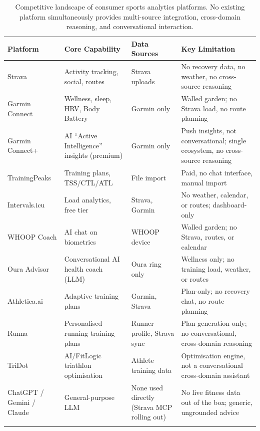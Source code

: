 \begin{table}[ht]
\begin{center}
\begin{minipage}{\textwidth}
\caption[Competitive landscape of consumer sports analytics platforms]{Competitive landscape of consumer sports analytics platforms. No existing platform simultaneously provides multi-source integration, cross-domain reasoning, and conversational interaction.}\label{tab:competitors}
\begin{tabularx}{\textwidth}{p{2.0cm}p{2.4cm}p{2.2cm}X}
\toprule
\textbf{Platform} & \textbf{Core Capability} & \textbf{Data Sources} & \textbf{Key Limitation} \\
\midrule
Strava & Activity tracking, social, routes & Strava uploads & No recovery data, no weather, no cross-source reasoning \\
\addlinespace
Garmin Connect & Wellness, sleep, HRV, Body Battery & Garmin only & Walled garden; no Strava load, no route planning \\
\addlinespace
Garmin Connect+ & AI ``Active Intelligence'' insights (premium) & Garmin only & Push insights, not conversational; single ecosystem, no cross-source reasoning \\
\addlinespace
TrainingPeaks & Training plans, TSS/CTL/ATL & File import & Paid, no chat interface, manual import \\
\addlinespace
Intervals.icu & Load analytics, free tier & Strava, Garmin & No weather, calendar, or routes; dashboard-only \\
\addlinespace
WHOOP Coach & AI chat on biometrics & WHOOP device & Walled garden; no Strava, routes, or calendar \\
\addlinespace
Oura Advisor & Conversational AI health coach (LLM) & Oura ring only & Wellness only; no training load, weather, or routes \\
\addlinespace
Athletica.ai & Adaptive training plans & Garmin, Strava & Plan-only; no recovery chat, no route planning \\
\addlinespace
Runna & Personalised running training plans & Runner profile, Strava sync & Plan generation only; no conversational, cross-domain reasoning \\
\addlinespace
TriDot & AI/FitLogic triathlon optimisation & Athlete training data & Optimisation engine, not a conversational cross-domain assistant \\
\addlinespace
ChatGPT / Gemini / Claude & General-purpose LLM & None used directly (Strava MCP rolling out) & No live fitness data out of the box; generic, ungrounded advice \\
\botrule
\end{tabularx}
\end{minipage}
\end{center}
\end{table}
